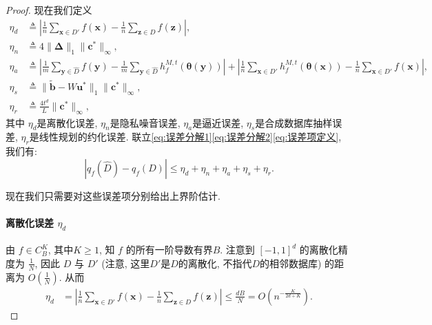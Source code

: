 \begin{proof}
现在我们定义
\begin{equation}\label{eq:误差项定义}
\begin{split}
\eta_d &\triangleq \left|\frac{1}{n}\sum_{\mathbf{x}\in D'}f(\mathbf{x}) -
\frac{1}{n}\sum_{\mathbf{z}\in D}f(\mathbf{z}) \right|,\\
\eta_n &\triangleq 4\|\boldsymbol{\Delta}\|_{1}\|\mathbf{c}^*\|_{\infty},\\
\eta_a &\triangleq \left|\frac{1}{m}\sum_{\mathbf{y}\in \hat{D}}f(\mathbf{y}) -  \frac{1}{m}\sum_{\mathbf{y}\in \hat{D}} h_f^{M,t}\left( \boldsymbol{\theta}(\mathbf{y}) \right) \right| + \left|\frac{1}{n}\sum_{\mathbf{x}\in D'} h_f^{M,t}\left( \boldsymbol{\theta}(\mathbf{x}) \right) - \frac{1}{n}\sum_{\mathbf{x}\in D'} f(\mathbf{x})  \right|,\\
\eta_s &\triangleq \|\tilde{\mathbf{b}}-W\mathbf{u}^*\|_{1}\|\mathbf{c}^*\|_{\infty},\\
\eta_r &\triangleq \frac{4t^d}{L}\|\mathbf{c}^*\|_{\infty},
\end{split}
\end{equation}
其中 $\eta_d$是离散化误差, $\eta_n$是隐私噪音误差, $\eta_a$是逼近误差, $\eta_s$是合成数据库抽样误差, $\eta_r$是线性规划的约化误差. 联立\eqref{eq:误差分解1}\eqref{eq:误差分解2}\eqref{eq:误差项定义}, 我们有:
\[
  \left|q_f(\hat{D}) - q_f(D) \right| \le \eta_d + \eta_n + \eta_a + \eta_s + \eta_r.
\]

现在我们只需要对这些误差项分别给出上界阶估计.

\paragraph{离散化误差 $\eta_d$} %
\label{par:离散化误差_eta_d_}
由 $f \in C_B^K$, 其中$K \ge 1$, 知 $f$ 的所有一阶导数有界$B$. 注意到 $[-1,1]^d$ 的离散化精度为 $\frac{1}{N}$, 因此 $D$ 与 $D'$ (注意, 这里$D'$是$D$的离散化, 不指代$D$的相邻数据库) 的距离为 $O(\frac{1}{N})$. 从而
\[
\begin{split}
 \eta_d &= \left|\frac{1}{n}\sum_{\mathbf{x}\in D'}f(\mathbf{x}) -
\frac{1}{n}\sum_{\mathbf{z}\in D}f(\mathbf{z}) \right| \le \frac{dB}{N} = O \left(n^{-\frac{K}{2d+K}}\right).
\end{split}
\]

\end{proof}
